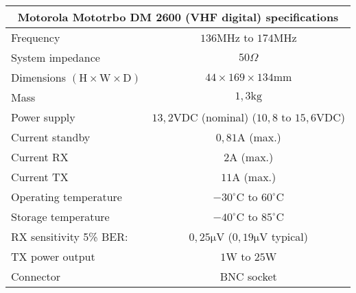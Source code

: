 \footnotesize
\begin{tabular}{|l|c|}
	\hline
	\multicolumn{2}{|c|}{\textbf{Motorola Mototrbo DM 2600 (VHF digital) specifications}} \\
	\hline
 	Frequency & $136\mathrm{MHz}$ to $174\mathrm{MHz}$ \\
	System impedance & $50\Omega$\\
 	Dimensions $\mathrm{(H \times W \times D)}$ & $44 \times 169 \times 134 \mathrm{mm}$ \\%
 	Mass & $1,3\mathrm{kg}$ \\%
	Power supply & $13,2\mathrm{VDC}$ (nominal) ($10,8$ to $15,6\mathrm{VDC}$) \\
	Current standby & $0,81\mathrm{A}$ (max.) \\
	Current RX & $2\mathrm{A}$ (max.) \\
	Current TX & $11\mathrm{A}$ (max.) \\
	Operating temperature & $-30^\circ \mathrm{C}$ to $60^\circ \mathrm{C}$ \\
	Storage temperature & $-40^\circ \mathrm{C}$ to $85^\circ \mathrm{C}$ \\
	RX sensitivity 5\% BER: & $0,25\mathrm{\mu V}$ ($0,19\mathrm{\mu V}$ typical) \\
	TX power output & $1\mathrm{W}$ to $25\mathrm{W}$ \\
	Connector & BNC socket\\
	\hline
\end{tabular}